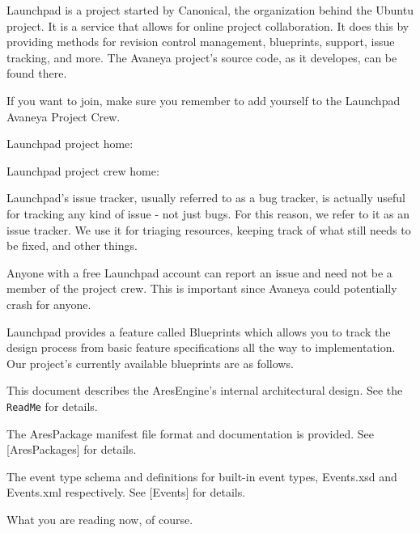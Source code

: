 

Launchpad is a project started by Canonical, the organization behind the Ubuntu project. It is a service that allows for online project collaboration. It does this by providing methods for revision control management, blueprints, support, issue tracking, and more. The Avaneya project's source code, as it developes, can be found there.

If you want to join, make sure you remember to add yourself to the Launchpad Avaneya Project Crew.

\blank[2*big]
\startnarrower[3*left]
Launchpad project home:\crlf
{}

\blank[2*big]
Launchpad project crew home:\crlf
{}
\stopnarrower

Launchpad's issue tracker, usually referred to as a bug tracker, is actually useful for tracking any kind of issue - not just bugs. For this reason, we refer to it as an issue tracker. We use it for triaging resources, keeping track of what still needs to be fixed, and other things. 

Anyone with a free Launchpad account can report an issue and need not be a member of the project crew. This is important since Avaneya could potentially crash for anyone.

\startnarrower[3*left]
\stopnarrower

Launchpad provides a feature called Blueprints which allows you to track the design process from basic feature specifications all the way to implementation. Our project's currently available blueprints are as follows.

\startitemize[4]

This document describes the AresEngine's internal architectural design. See the {\tt ReadMe} for details.

\startnarrower[3*left]
\stopnarrower


The AresPackage manifest file format and documentation is provided. See [AresPackages] for details.

\startnarrower[3*left]
\stopnarrower


The event type schema and definitions for built-in event types, Events.xsd and Events.xml respectively. See [Events] for details.


What you are reading now, of course.
\stopitemize

